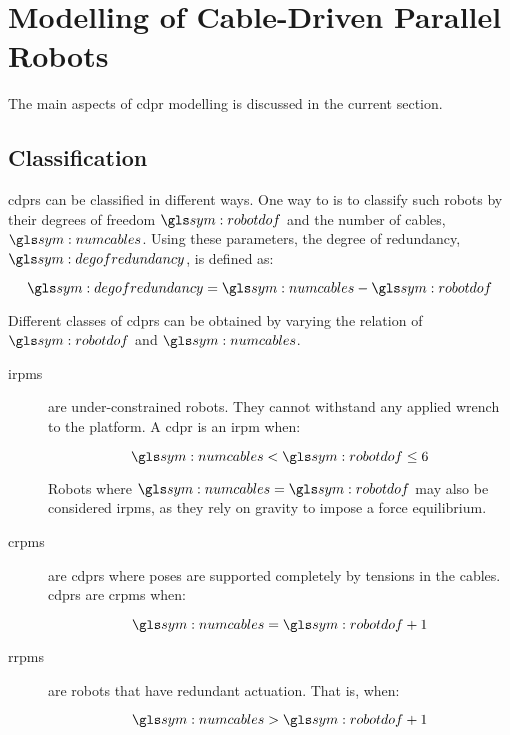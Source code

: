 \section{Modelling of Cable-Driven Parallel Robots}%
\label{sec:modelling_of_cable_driven_parallel_robots}

	The main aspects of \gls{cdpr} modelling is discussed in the current
	section. 

	\subsection{ Classification}%
	\label{sec:cdpr_classification}

		\glspl{cdpr} can be classified in different ways. One way to is to
		classify such robots by their degrees of freedom $\robotdof$ and the
		number of cables, $\numcables$. Using these parameters, the degree of
		redundancy, $\degofredundancy$, is defined as:

		\begin{equation}
			\degofredundancy = \numcables - \robotdof
		\end{equation}

		Different classes of \glspl{cdpr} can be obtained by varying the
		relation of $\robotdof$ and $\numcables$.

		\begin{description}

			\item[\glspl{irpm}]

				are under-constrained robots. They cannot withstand any applied
				wrench to the platform. A \gls{cdpr} is an \gls{irpm} when:

				\begin{equation}
					\numcables < \robotdof \leq 6
				\end{equation}

				Robots where $\numcables = \robotdof$ may also be considered
				\glspl{irpm}, as they rely on gravity to impose a force
				equilibrium.

			\item[\glspl{crpm}]

				are \glspl{cdpr} where poses are supported completely by
				tensions in the cables. \glspl{cdpr} are \glspl{crpm} when:

				\begin{equation}
					\numcables = \robotdof + 1
				\end{equation}

			\item[\glspl{rrpm}]

				are robots that have redundant actuation. That is, when:

				\begin{equation}
					\numcables > \robotdof + 1
				\end{equation}
		\end{description}


